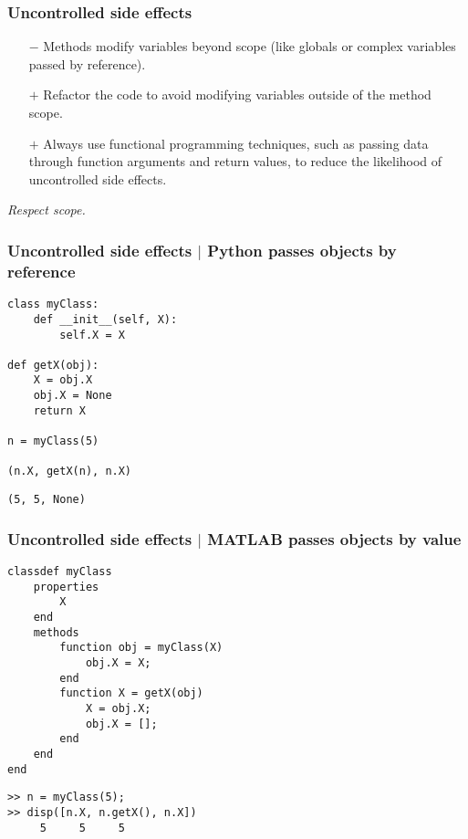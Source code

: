 \documentclass{beamer}
\begin{document}
\begin{frame}[fragile]
\frametitle{Uncontrolled side effects}
\begin{itemize}
\item[$-$] Methods modify variables beyond scope (like globals or complex variables passed by reference).
\item[$+$] Refactor the code to avoid modifying variables outside of the method scope.
\item[$+$] Always use functional programming techniques, such as passing data through function arguments and return values, to reduce the likelihood of uncontrolled side effects.
\end{itemize}

\emph{Respect scope.}
\end{frame}

\begin{frame}[fragile]
\frametitle{Uncontrolled side effects $|$ Python passes objects by reference}
\begin{lstlisting}[style=python]
class myClass:
    def __init__(self, X):
        self.X = X

def getX(obj):
    X = obj.X
    obj.X = None
    return X

n = myClass(5)

(n.X, getX(n), n.X)
\end{lstlisting}

\begin{lstlisting}[style=output]
(5, 5, None)
\end{lstlisting}

\end{frame}


\begin{frame}[fragile]
\frametitle{Uncontrolled side effects $|$ MATLAB passes objects by value}
\begin{lstlisting}[style=MATLAB]
classdef myClass
    properties
        X
    end
    methods
        function obj = myClass(X)
            obj.X = X;
        end
        function X = getX(obj)
            X = obj.X;
            obj.X = [];
        end
    end
end
\end{lstlisting}

\begin{lstlisting}[style=output]
>> n = myClass(5);
>> disp([n.X, n.getX(), n.X])
     5     5     5
\end{lstlisting}

\end{frame}
\end{document}
